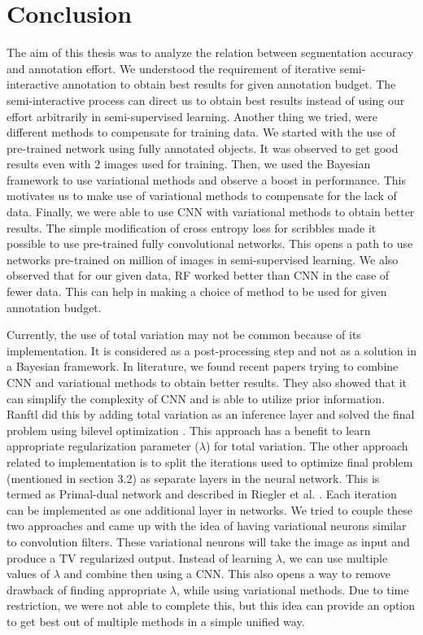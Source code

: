 %

\chapter{Conclusion}
The aim of this thesis was to analyze the relation between segmentation accuracy and annotation effort. We understood the requirement of iterative semi-interactive annotation to obtain best results for given annotation budget. The semi-interactive process can direct us to obtain best results instead of using our effort arbitrarily in semi-supervised learning. Another thing we tried, were different methods to compensate for training data. We started with the use of pre-trained network using fully annotated objects. It was observed to get good results even with 2 images used for training. Then, we used the Bayesian framework to use variational methods and observe a boost in performance. This motivates us to make use of variational methods to compensate for the lack of data. Finally, we were able to use CNN with variational methods to obtain better results. The simple modification of cross entropy loss for scribbles made it possible to use pre-trained fully convolutional networks. This opens a path to use networks pre-trained on million of images in semi-supervised learning. We also observed that for our given data, RF worked better than CNN in the case of fewer data. This can help in making a choice of method to be used for given annotation budget. \par
Currently, the use of total variation may not be common because of its implementation. It is considered as a post-processing step and not as a solution in a Bayesian framework. In literature, we found recent papers trying to combine CNN and variational methods to obtain better results. They also showed that it can simplify the complexity of CNN and is able to utilize prior information. Ranftl \cite{ranftl:2014} did this by adding total variation as an inference layer and solved the final problem using bilevel optimization \cite{ochs:2015}. This approach has a benefit to learn appropriate regularization parameter ($\lambda$) for total variation. The other approach related to implementation is to split the iterations used to optimize final problem (mentioned in section 3.2) as separate layers in the neural network. This is termed as Primal-dual network and described in Riegler et al. \cite{riegler:2016}. Each iteration can be implemented as one additional layer in networks. We tried to couple these two approaches and came up with the idea of having variational neurons similar to convolution filters. These variational neurons will take the image as input and produce a TV regularized output. Instead of learning $\lambda$, we can use multiple values of $\lambda$ and combine then using a CNN. This also opens a way to remove drawback of finding appropriate $\lambda$, while using variational methods. Due to time restriction, we were not able to complete this, but this idea can provide an option to get best out of multiple methods in a simple unified way. 